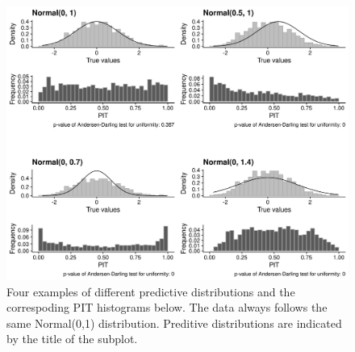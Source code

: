 \documentclass[
]{book}
\begin{document}
\begin{figure}

{\centering \includegraphics[width=1\linewidth]{../visualisation/chapter-3-evaluation/calibration-examples} 

}

\caption{Four examples of different predictive distributions and the correspoding PIT histograms below. The data always follows the same Normal(0,1) distribution. Preditive distributions are indicated by the title of the subplot.}\label{fig:pit-examples}
\end{figure}
\end{document}

